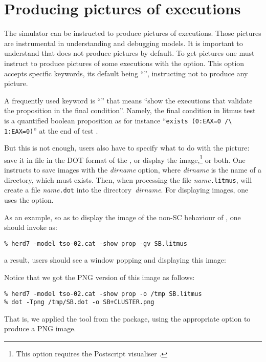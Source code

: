 \section{Producing pictures of executions}
The simulator \herd{} can be instructed to produce pictures of
executions.
Those pictures are instrumental in understanding and
debugging models.
It is important to understand that \herd{} does not produce pictures
by default. To get pictures one must instruct \herd{} to produce
pictures of some executions with the  option.
This option accepts specific keywords, its default being ``'',
instructing \herd{} not to produce any picture.

A frequently used keyword is ``'' that means ``show the executions
that validate the proposition in the final condition''.
Namely, the final condition in litmus test is a quantified
boolean proposition as for instance ``\verb+exists (0:EAX=0 /\ 1:EAX=0)+'' at the end of test .

But this is not enough, users also have to specify what to do with the picture:
save it in file in the DOT format of the
, or
display the image,\footnote{This option requires
the Postscript visualiser .} or both.
One instructs  \herd{} to save images with the \textit{dirname} option,
where \textit{dirname} is the name of a directory, which must exists.
Then, when processing the file \textit{name}\texttt{.litmus},
\herd{} will create a file \textit{name}\texttt{.dot} into the
directory~\textit{dirname}.
For displaying images, one uses the  option.

\label{sec:show}As an example,
so as to display the image of the non-SC behaviour of , one
should invoke \herd{} as:
\begin{verbatim}
% herd7 -model tso-02.cat -show prop -gv SB.litmus
\end{verbatim}
a result, users should see a window popping and displaying this image:
\begin{center}\end{center}
Notice that we got the PNG version of this image as follows:
\begin{verbatim}
% herd7 -model tso-02.cat -show prop -o /tmp SB.litmus
% dot -Tpng /tmp/SB.dot -o SB+CLUSTER.png
\end{verbatim}
That is, we applied the  tool from the
 package, using the appropriate option
to produce a PNG image.


